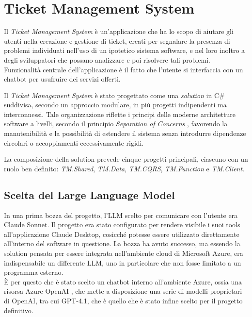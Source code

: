 \chapter{Ticket Management System}

Il \textit{Ticket Management System} è un'applicazione che ha lo scopo di aiutare gli utenti nella creazione e gestione di ticket,
creati per segnalare la presenza di problemi individuati nell'uso di un ipotetico sistema software, e nel loro inoltro a degli sviluppatori
che possano analizzare e poi risolvere tali problemi. Funzionalità centrale dell'applicazione è il fatto che l'utente si interfaccia con un chatbot
per usufruire dei servizi offerti.

Il \textit{Ticket Management System} è stato progettato come una \textit{solution} in C\# suddivisa, secondo un approccio modulare,
in più progetti indipendenti ma interconnessi. Tale organizzazione riflette i principi delle moderne architetture software a livelli,
secondo il principio \textit{Separation of Concerns} \cite{msdn2009separation}, favorendo la manutenibilità e la possibilità di estendere il sistema
senza introdurre dipendenze circolari o accoppiamenti eccessivamente rigidi.

La composizione della solution prevede cinque progetti principali, ciascuno con un ruolo ben definito: \textit{TM.Shared}, \textit{TM.Data},
\textit{TM.CQRS}, \textit{TM.Function} e \textit{TM.Client}.

\newpage
\section{Scelta del Large Language Model}
In una prima bozza del progetto, l'LLM scelto per comunicare con l'utente era Claude Sonnet. Il progetto era stato configurato per rendere visibile i suoi
tools all'applicazione Claude Desktop, cosicché potesse essere utilizzato direttamente all'interno del software in questione. La bozza ha avuto successo, ma
essendo la solution pensata per essere integrata nell'ambiente cloud di Microsoft Azure, era indispensabile un differente LLM, uno in particolare che non fosse
limitato a un programma esterno. \\
È per questo che è stato scelto un chatbot interno all'ambiente Azure, ossia una risorsa Azure OpenAI \cite{azure_openai_foundry}, che mette a disposizione
una serie di modelli proprietari di OpenAI, tra cui GPT-4.1, che è quello che è stato infine scelto per il progetto definitivo.

\newpage
